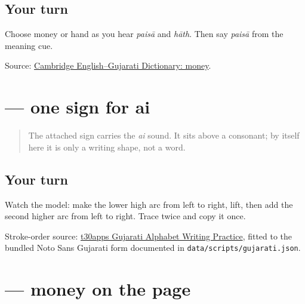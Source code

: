\subsection*{Your turn}
Choose money or hand as you hear \emph{paisā} and \emph{hāth}. Then say \emph{paisā} from the meaning cue.

\begin{tcolorbox}[breakable,colback=teal!4,colframe=teal!35!black,title={Before you move on}]
Source: \href{https://dictionary.cambridge.org/dictionary/english-gujarati/money}{Cambridge English–Gujarati Dictionary: money}.
\end{tcolorbox}
\section[\texorpdfstring{\gu{ૈ} (ai vowel sign)}{ૈ (ai vowel sign)}]{ — one sign for ai}

\label{lesson:GU-W21-ai-matra}



\begin{quote}
The attached sign \textbf{} carries the \emph{ai} sound. It sits above a consonant; by itself here it is only a writing shape, not a word.
\end{quote}

\subsection*{Your turn}

Watch the model: make the lower high arc from left to right, lift, then add the second higher arc from left to right. Trace \textbf{} twice and copy it once.

\begin{tcolorbox}[breakable,colback=teal!4,colframe=teal!35!black,title={Before you move on}]
Stroke-order source: \href{https://www.t30apps.com/gujarati-alphabet-writing/}{t30apps Gujarati Alphabet Writing Practice}, fitted to the bundled Noto Sans Gujarati form documented in \texttt{data/scripts/gujarati.json}.
\end{tcolorbox}
\section[\texorpdfstring{\gu{પૈસા} (paisā)}{પૈસા (paisā)}]{ — money on the page}

\label{lesson:GU-C21-paisa}



